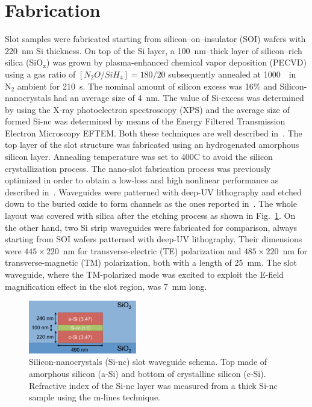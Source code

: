 \documentclass[10pt,letterpaper]{article}
\begin{document}
\section{Fabrication}
Slot samples were fabricated starting from silicon--on--insulator (SOI) wafers with 220~nm Si thickness. On top of the Si layer, a 100~nm--thick layer of silicon--rich silica ($ \mathrm{SiO_x} $) was grown by plasma-enhanced chemical vapor deposition (PECVD) using a gas ratio of $[N_2O/SiH_4]=180/20$ subsequently annealed at 1000~\textcelsius ~in $ \mathrm{N}_2 $ ambient for 210~s. The nominal amount of silicon excess was 16\% and Silicon-nanocrystals had an average size of 4~nm. The value of Si-excess was determined by using the X-ray photoelectron spectroscopy (XPS) and the average size of formed Si-nc was determined by means of the Energy Filtered Transmission Electron Microscopy EFTEM. Both these techniques are well described in~\cite{Garcia2004}. The top layer of the slot structure was fabricated using an hydrogenated amorphous silicon layer. Annealing temperature was set to 400\textdegree C to avoid the silicon crystallization process. The nano-slot fabrication process was previously optimized in order 
to obtain a low-loss and high nonlinear 
performance as described in~\cite{Jordana2007}. Waveguides were patterned with 
deep-UV lithography and etched down to the buried oxide to form channels as the ones reported in~\cite{Martinez2010a, Trita2011}. The whole layout was covered with silica after the etching process as shown in Fig.~\ref{fig:semSlot}. On the other hand, two Si strip waveguides were fabricated for comparison, always starting  from SOI wafers patterned with deep-UV lithography. Their dimensions were $445\times220$~nm for transverse-electric (TE) polarization and $485\times220$~nm for transverse-magnetic (TM) polarization, both with a length of 25~mm. The slot waveguide, where the TM-polarized mode was excited to exploit the E-field magnification effect in the slot region, was 7~mm long.


\begin{figure}[htb]
\centering
\includegraphics[width=0.42\textwidth]{slot5}%
\caption{Silicon-nanocrystals (Si-nc) slot waveguide schema. Top made of amorphous silicon (a-Si) and bottom of crystalline silicon (c-Si). Refractive index of the Si-nc layer was measured from a thick Si-nc sample using the m-lines technique.}
\label{fig:semSlot}
\end{figure}
\end{document}
